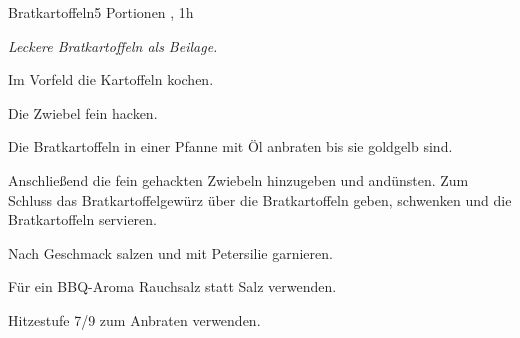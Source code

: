 \documentclass[../recipe-collections/cooking.tex]{subfiles}
\begin{document}
\begin{recipe}{Bratkartoffeln}{5 Portionen }{, 1h }

  \freeform{}\textit{Leckere Bratkartoffeln als Beilage.}


  Im Vorfeld die Kartoffeln kochen.


  Die Zwiebel fein hacken.


  Die Bratkartoffeln in einer Pfanne mit Öl anbraten bis sie goldgelb sind.


  Anschließend die fein gehackten Zwiebeln hinzugeben und andünsten.
  Zum Schluss das Bratkartoffelgewürz über die Bratkartoffeln geben, schwenken und die Bratkartoffeln servieren.


  Nach Geschmack salzen und mit Petersilie garnieren.

  \freeform{}\hrulefill{}

  \freeform{}
  Für ein BBQ-Aroma Rauchsalz statt Salz verwenden.

  \freeform{}
  Hitzestufe 7/9 zum Anbraten verwenden.

\end{recipe}
\end{document}
